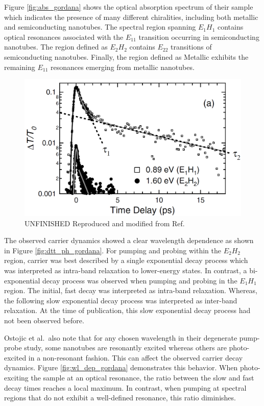 Figure \ref{fig:abs_gordana} shows the optical absorption spectrum of their sample which indicates the presence of many different chiralities, including both metallic and semiconducting nanotubes. The spectral region spanning $E_{1} H_{1}$ contains optical resonances associated with the $E_{11}$ transition occurring in semiconducting nanotubes. The region defined as $E_{2} H_{2}$ contains $E_{22}$ transitions of semiconducting nanotubes. Finally, the region defined as Metallic exhibits the remaining $E_{11}$ resonances emerging from metallic nanotubes.

\begin{figure}[ht]
	\centering
	\includegraphics[scale=0.3]{images/chapter_prior_works/dtt_gordana}
	\caption{{\color{red} UNFINISHED } Reproduced and modified from Ref.\ \cite{ostojic2004interband}}
	\label{fig: abs_gordana}
\end{figure}

The observed carrier dynamics showed a clear wavelength dependence as shown in Figure \ref{fig:dtt_ph_gordana}. For pumping and probing within the $E_2 H_2$ region, carrier was best described by a single exponential decay process which was interpreted as intra-band relaxation to lower-energy states. In contrast, a bi-exponential decay process was observed when pumping and probing in the $E_1 H_1$ region. The initial, fast decay was interpreted as intra-band relaxation. Whereas, the following slow exponential decay process was interpreted as inter-band relaxation. At the time of publication, this slow exponential decay process had not been observed before.

Ostojic et al.\  also note that for any chosen wavelength in their degenerate pump-probe study, some nanotubes are resonantly excited whereas others are photo-excited in a non-resonant fashion. This can affect the observed carrier decay dynamics. Figure \ref{fig:wl_dep_gordana} demonstrates this behavior. When photo-exciting the sample at an optical resonance, the ratio between the slow and fast decay times reaches a local maximum. In contrast, when pumping at spectral regions that do not exhibit a well-defined resonance, this ratio diminishes.

